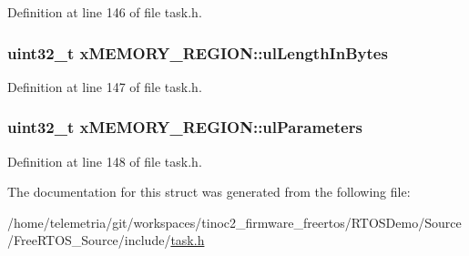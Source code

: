 Definition at line 146 of file task.\+h.

\subsubsection[{\texorpdfstring{ul\+Length\+In\+Bytes}{ulLengthInBytes}}]{\setlength{\rightskip}{0pt plus 5cm}uint32\+\_\+t x\+M\+E\+M\+O\+R\+Y\+\_\+\+R\+E\+G\+I\+O\+N\+::ul\+Length\+In\+Bytes}\hypertarget{structx_m_e_m_o_r_y___r_e_g_i_o_n_a97e59578d3c4c46270d33e7206258a65}{}\label{structx_m_e_m_o_r_y___r_e_g_i_o_n_a97e59578d3c4c46270d33e7206258a65}


Definition at line 147 of file task.\+h.

\subsubsection[{\texorpdfstring{ul\+Parameters}{ulParameters}}]{\setlength{\rightskip}{0pt plus 5cm}uint32\+\_\+t x\+M\+E\+M\+O\+R\+Y\+\_\+\+R\+E\+G\+I\+O\+N\+::ul\+Parameters}\hypertarget{structx_m_e_m_o_r_y___r_e_g_i_o_n_a6ba180553e9a318f23acc5f4664934e3}{}\label{structx_m_e_m_o_r_y___r_e_g_i_o_n_a6ba180553e9a318f23acc5f4664934e3}


Definition at line 148 of file task.\+h.



The documentation for this struct was generated from the following file\+:\begin{DoxyCompactItemize}
\item 
/home/telemetria/git/workspaces/tinoc2\+\_\+firmware\+\_\+freertos/\+R\+T\+O\+S\+Demo/\+Source/\+Free\+R\+T\+O\+S\+\_\+\+Source/include/\hyperlink{task_8h}{task.\+h}\end{DoxyCompactItemize}
